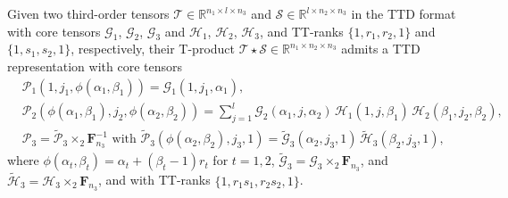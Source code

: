 \documentclass[onefignum,onetabnum]{siamart250211}
\begin{document}
\begin{proposition}\label{prop:ttd_tprod}
Given two third-order tensors 
$\mathscr{T}\in\mathbb{R}^{n_1\times l\times n_3}$ and
$\mathscr{S}\in\mathbb{R}^{l\times n_2\times n_3}$ in the TTD format with core tensors $\mathscr{G}_1$, $\mathscr{G}_2$, $\mathscr{G}_3$ and $\mathscr{H}_1$, 
$\mathscr{H}_2$,
$\mathscr{H}_3$, and TT-ranks $\{1,r_1,r_2,1\}$ and $\{1,s_1,s_2,1\}$, respectively, their T-product $\mathscr{T}\star\mathscr{S}\in\mathbb{R}^{n_1\times n_2\times n_3}$ admits a TTD representation with core tensors
\begin{align*}
     &\mathscr{P}_1(1,j_1,\phi(\alpha_1,\beta_1)) = \mathscr{G}_1(1,j_1,\alpha_1), \\
    &\mathscr{P}_2(\phi(\alpha_1,\beta_1),j_2,\phi(\alpha_2,\beta_2)) = \sum_{j=1}^{l}
    \mathscr{G}_2(\alpha_1,j,\alpha_2)\,
    \mathscr{H}_1(1,j,\beta_1)\,
    \mathscr{H}_2(\beta_1,j_2,\beta_2), \\
    &\mathscr{P}_3 = \widetilde{\mathscr{P}}_3 \times_2 \textbf{F}_{n_3}^{-1} \text{ with } \widetilde{\mathscr{P}}_3(\phi(\alpha_2,\beta_2),j_3,1) =
    \widetilde{\mathscr{G}}_3(\alpha_2,j_3,1)\,
    \widetilde{\mathscr{H}}_3(\beta_2,j_3,1),
\end{align*} 
where $\phi(\alpha_t,\beta_t)=\alpha_t+(\beta_t-1)r_t$ for $t=1,2$, $\widetilde{\mathscr{G}}_3=\mathscr{G}_3\times_2\textbf{F}_{n_3}$, and
$\widetilde{\mathscr{H}}_3=\mathscr{H}_3\times_2\textbf{F}_{n_3}$,  and with TT-ranks $\{1,r_1s_1,r_2s_2,1\}$.
\end{proposition}
\end{document}
